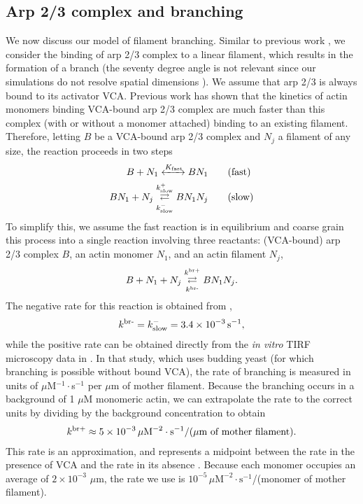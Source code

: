 \documentclass[11pt]{article}
\begin{document}
\subsection{Arp 2/3 complex and branching}
We now discuss our model of filament branching. Similar to previous work \cite{ni2019turnover}, we consider the binding of arp 2/3 complex to a linear filament, which results in the formation of a branch (the seventy degree angle is not relevant since our simulations do not resolve spatial dimensions \cite{pollard2007regulation}). We assume that arp 2/3 is always bound to its activator VCA. Previous work \cite{beltzner2008pathway} has shown that the kinetics of actin monomers binding VCA-bound arp 2/3 complex are much faster than this complex (with or without a monomer attached) binding to an existing filament. Therefore, letting $B$ be a VCA-bound arp 2/3 complex and $N_j$ a filament of any size, the reaction proceeds in two steps
\begin{subequations}
\label{eq:BothRxnsArp}
\begin{align}
\label{eq:fastrxn}
B + N_1 \xleftrightarrow{K_\text{fast}} BN_1 \qquad & \text{(fast)}\\
BN_1 + N_j \overset{k_\text{slow}^+}{\underset{k_\text{slow}^-}\rightleftarrows} BN_1N_j \qquad & \text{(slow)}
\end{align}
\end{subequations}
To simplify this, we assume the fast reaction is in equilibrium and coarse grain this process into a single reaction involving three reactants: (VCA-bound) arp 2/3 complex $B$, an actin monomer $N_1$, and an actin filament $N_j$, 
\begin{equation}
\label{eq:ArpRxn}
B + N_1 + N_j \overset{k^\text{br+}}{\underset{k^\text{br-}}\rightleftarrows} BN_1N_j. 
\end{equation}
The negative rate for this reaction is obtained from \cite{beltzner2008pathway},
\begin{gather*}
k^\text{br-} = k_\text{slow}^- = 3.4 \times 10^{-3} \, \text{s}^{-1},
\end{gather*}
while the positive rate can be obtained directly from the \emph{in vitro} TIRF microscopy data in \cite{smith2013pathway}. In that study, which uses budding yeast (for which branching is possible without bound VCA), the rate of branching is measured in units of $\mu$M$^{-1}\cdot$s$^{-1}$ per $\mu$m of mother filament. Because the branching occurs in a background of 1 $\mu$M monomeric actin, we can extrapolate the rate to the correct units by dividing by the background concentration to obtain
\begin{gather*}
k^\text{br+} \approx 5 \times 10^{-3} \, \mu \text{M}^{-2} \cdot \text{s}^{-1}/(\mu\text{m of mother filament}).
\end{gather*}
This rate is an approximation, and represents a midpoint between the rate in the presence of VCA and the rate in its absence \cite{smith2013pathway}. Because each monomer occupies an average of $2 \times 10^{-3}$ $\mu$m, the rate we use is $10^{-5} \, \mu \text{M}^{-2} \cdot \text{s}^{-1}$/(monomer of mother filament). 
\end{document}
